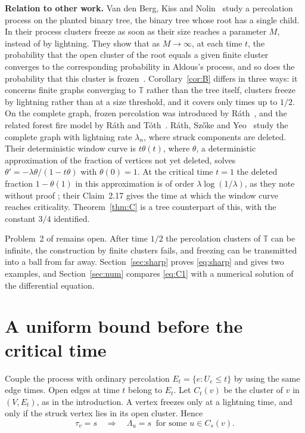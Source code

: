\documentclass[11pt]{amsart}
\theoremstyle{remark}
\numberwithin{equation}{section}
\newcommand{\T}{\mathbb{T}}
\begin{document}
\smallskip
\noindent\textbf{Relation to other work.}
Van den Berg, Kiss and
Nolin~\cite{BKN12} study a percolation process on the planted binary
tree, the binary tree whose root has a single child. In their process
clusters freeze as soon as their size reaches a parameter $M$, instead of
by lightning. They show that as $M\to\infty$, at each time $t$, the probability that
the open cluster of the root equals a given finite cluster converges to
the corresponding probability in Aldous's process, and so does the
probability that this cluster is frozen~\cite[Theorem~1]{BKN12}. Corollary~\ref{cor:B} differs in three ways: it
concerns finite graphs converging to $\T$ rather than the tree itself,
clusters freeze by lightning rather than at a size threshold, and it
covers only times up to $1/2$. On the complete graph, frozen
percolation was introduced by Ráth~\cite{Rat09}, and the related forest fire model by
Ráth and Tóth~\cite{RT09}. Ráth, Szőke and Yeo~\cite{RSY26} study the
complete graph with lightning rate $\lambda_n$, where struck components
are deleted. Their deterministic window curve is $t\theta(t)$, where
$\theta$, a deterministic approximation of the fraction of vertices not yet
deleted, solves $\theta'=-\lambda\theta/(1-t\theta)$ with $\theta(0)=1$. At the critical
time $t=1$ the deleted fraction $1-\theta(1)$ in this approximation is
of order $\lambda\log(1/\lambda)$, as they note
without proof \cite[Remark~2.18]{RSY26}; their Claim~2.17 gives the time
at which the window curve reaches criticality. Theorem~\ref{thm:C} is a tree
counterpart of this, with the constant $3/4$ identified.

Problem~2 of \cite{RST21} remains open. After time $1/2$ the
percolation clusters of $\T$ can be infinite, the construction by finite
clusters fails, and freezing can be transmitted into a ball from far
away.
Section~\ref{sec:sharp} proves \eqref{eq:sharp} and gives two examples,
and Section~\ref{sec:num} compares \eqref{eq:C1} with a numerical
solution of the differential equation.

\section{A uniform bound before the critical time}\label{sec:A}

Couple the process with ordinary percolation $E_t=\{e:U_e\le t\}$ by
using the same edge times. Open edges at time $t$ belong to $E_t$. Let
$C_t(v)$ be the cluster of $v$ in $(V,E_t)$, as in the introduction. A vertex freezes only at a
lightning time, and only if the struck vertex lies in its open cluster.
Hence
\begin{equation}\label{eq:necessary}
\tau_v=s\quad\Longrightarrow\quad \Lambda_u=s\ \text{ for some } u\in C_s(v).
\end{equation}
\end{document}
